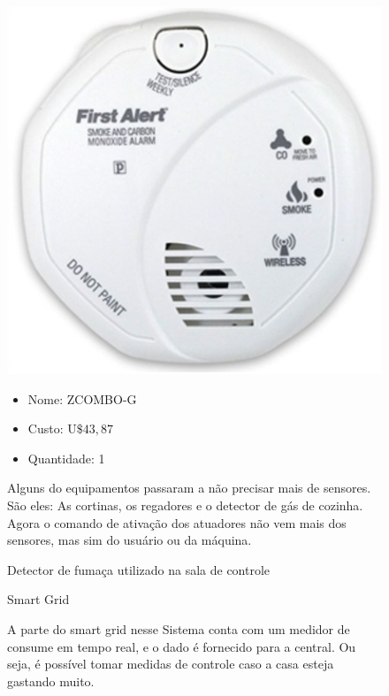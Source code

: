 \begin{enumerate}
\begin{figure}[h]
	  \begin{center}
		\includegraphics[keepaspectratio,scale=0.60]{figuras/detector_fumaca.eps}
		\caption{Detector de fumaça utilizado na sala de controle}
	  \end{center}

	\begin{itemize}
		\item Nome: ZCOMBO-G
		\item Custo: U$\$ 43,87$
		\item Quantidade: 1
	\end{itemize}
	
	Alguns do equipamentos passaram a não precisar mais de sensores. São eles: As cortinas, os regadores e o detector de gás de cozinha. Agora o comando de ativação dos atuadores não vem mais dos sensores, mas sim do usuário ou da máquina. 
	\end{figure}
	
	\begin{figure}[h]
	\item Smart Grid
	
	A parte do smart grid nesse Sistema conta com um medidor de consume em tempo real, e o dado é fornecido para a central. Ou seja, é possível tomar medidas de controle caso a casa esteja gastando muito.
	

\end{figure}
\end{enumerate}
